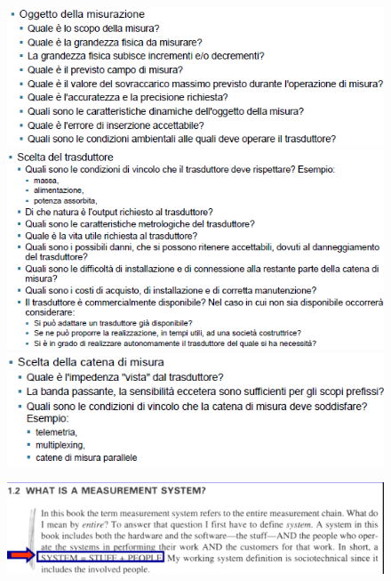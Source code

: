 \documentclass[a4paper, 15pt]{article}
\begin{document}
\begin{adjustwidth}{2in}{}
\begin{figure}[H]
	\centering
	\includegraphics[width=0.5\linewidth]{fig/screenshot041}
	\includegraphics[width=0.5\linewidth]{fig/screenshot042}
	\includegraphics[width=0.5\linewidth]{fig/screenshot043}	
	\label{fig:screenshot041}
\end{figure}
\begin{figure}[H]
	\centering
	\includegraphics[width=0.7\linewidth]{fig/screenshot044}
	\label{fig:screenshot044}
\end{figure}

\end{adjustwidth}


\newpage
\end{document}
